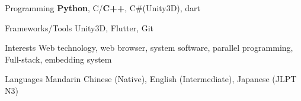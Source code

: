 
\begin{cvskills}
    \cvskill
    {Programming} %
    {\textbf{Python}, C/\textbf{C++}, C\#(Unity3D), dart} %
    
    \cvskill
    {Frameworks/Tools}
    {Unity3D, Flutter, Git}
    
    \cvskill
    {Interests} %
    {Web technology, web browser, system software, parallel programming, Full-stack, embedding system} %


    \cvskill
    {Languages} %
    {Mandarin Chinese (Native), English (Intermediate), Japanese (JLPT N3)} %
    
\end{cvskills}